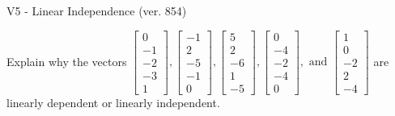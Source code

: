 \begin{exercise}
  \begin{exerciseTitle}V5 - Linear Independence (ver. 854)\end{exerciseTitle}
  \begin{exerciseStatement}
    Explain why the vectors \(\left[\begin{array}{r}
0 \\
-1 \\
-2 \\
-3 \\
1
\end{array}\right] , \left[\begin{array}{r}
-1 \\
2 \\
-5 \\
-1 \\
0
\end{array}\right] , \left[\begin{array}{r}
5 \\
2 \\
-6 \\
1 \\
-5
\end{array}\right] , \left[\begin{array}{r}
0 \\
-4 \\
-2 \\
-4 \\
0
\end{array}\right] , \text{ and } \left[\begin{array}{r}
1 \\
0 \\
-2 \\
2 \\
-4
\end{array}\right]\) are linearly dependent or linearly independent.	



\end{exerciseStatement}
\end{exercise}
